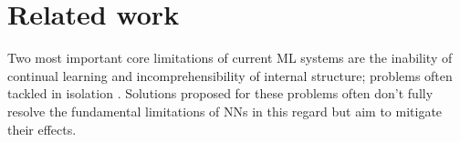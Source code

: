 \section{Related work}
\label{sec:related_work}


Two most important core limitations of current ML systems are the inability of continual learning and incomprehensibility of internal structure; problems often tackled in isolation \cite{kirkpatrick2017overcoming,rusu2016progressive,jacobson2022task,hadsell2020embracing,zhuang2020comprehensive,xu2019explainable}. Solutions proposed for these problems often don't fully resolve the fundamental limitations of NNs in this regard but aim to mitigate their effects.



